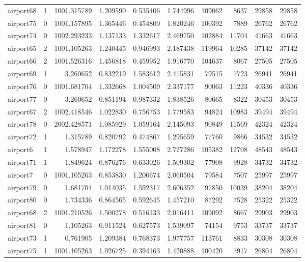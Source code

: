 \begin{longtable}{|l|r|r|r|r|r|r|r|r|r|}
airport68 & 1 & 1001.315789 & 1.209590 & 0.535406 & 1.744996 & 109062 & 8637 & 29858 & 29858 \\
airport75 & 0 & 1001.157895 & 1.365446 & 0.454800 & 1.820246 & 100392 & 7889 & 26762 & 26762 \\
airport74 & 0 & 1002.293233 & 1.137133 & 1.332617 & 2.469750 & 102884 & 11704 & 41663 & 41663 \\
airport65 & 2 & 1001.105263 & 1.240445 & 0.946993 & 2.187438 & 119964 & 10285 & 37142 & 37142 \\
airport66 & 2 & 1001.526316 & 1.456818 & 0.459952 & 1.916770 & 104637 & 8067 & 27505 & 27505 \\
airport69 & 1 & 3.260652 & 0.832219 & 1.583612 & 2.415831 & 79515 & 7723 & 26941 & 26941 \\
airport76 & 0 & 1001.681704 & 1.332668 & 1.004509 & 2.337177 & 90063 & 11223 & 40336 & 40336 \\
airport77 & 0 & 3.260652 & 0.851194 & 0.987332 & 1.838526 & 80665 & 8322 & 30453 & 30453 \\
airport67 & 2 & 1002.418546 & 1.022830 & 0.756753 & 1.779583 & 94824 & 10983 & 39494 & 39494 \\
airport78 & 0 & 2002.428571 & 1.085929 & 1.059164 & 2.145093 & 90849 & 11569 & 42324 & 42324 \\
airport72 & 1 & 1.315789 & 0.820792 & 0.474867 & 1.295659 & 77760 & 9866 & 34532 & 34532 \\
airport6 & 1 & 1.578947 & 1.172278 & 1.555008 & 2.727286 & 105382 & 12708 & 48543 & 48543 \\
airport71 & 1 & 1.849624 & 0.876276 & 0.633026 & 1.509302 & 77908 & 9928 & 34732 & 34732 \\
airport7 & 0 & 1001.105263 & 0.853830 & 1.206674 & 2.060504 & 79584 & 7507 & 25997 & 25997 \\
airport79 & 0 & 1.681704 & 1.014035 & 1.592317 & 2.606352 & 97850 & 10039 & 38204 & 38204 \\
airport80 & 0 & 1.734336 & 0.864565 & 0.592645 & 1.457210 & 87292 & 7528 & 25322 & 25322 \\
airport68 & 2 & 1001.210526 & 1.500278 & 0.516133 & 2.016411 & 109092 & 8667 & 29903 & 29903 \\
airport81 & 0 & 1.105263 & 0.911524 & 0.627573 & 1.539097 & 74154 & 9753 & 33737 & 33737 \\
airport73 & 1 & 0.761905 & 1.209384 & 0.768373 & 1.977757 & 113761 & 8833 & 30308 & 30308 \\
airport75 & 1 & 1001.105263 & 1.026725 & 0.394163 & 1.420888 & 100420 & 7917 & 26804 & 26804 \\

\end{longtable}
